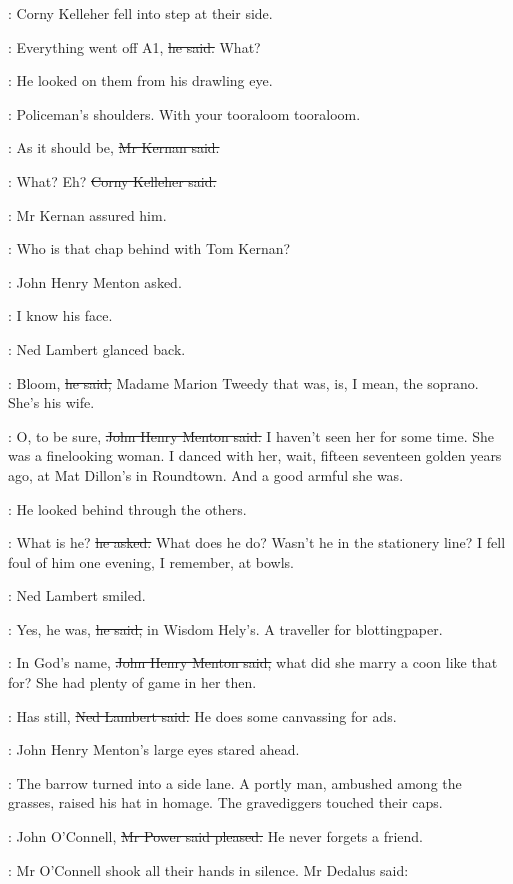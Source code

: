 :
Corny Kelleher fell into step at their side.

\corny:
Everything went off A1,
\sout{he said.}
What?

:
He looked on them from his drawling eye.

\BloomInt:
Policeman's shoulders.
With your tooraloom tooraloom.

:
As it should be,
\sout{Mr Kernan said.}

\corny:
What?
Eh?
\sout{Corny Kelleher said.}

:
Mr Kernan assured him.

\menton:
Who is that chap behind with Tom Kernan?

:
John Henry Menton asked.

\menton:
I know his face.

:
Ned Lambert glanced back.

\lambert:
Bloom,
\sout{he said,}
Madame Marion Tweedy that was,
is, I mean,
the soprano.
She's his wife.

\menton:
O, to be sure,
\sout{John Henry Menton said.}
I haven't seen her for some time.
She was a finelooking woman.
I danced with her, wait, fifteen seventeen golden years ago,
at Mat Dillon's in Roundtown.
And a good armful she was.

:
He looked behind through the others.

\menton:
What is he?
\sout{he asked.}
What does he do?
Wasn't he in the stationery line?
I fell foul of him one evening, I remember, at bowls.

:
Ned Lambert smiled.

\lambert:
Yes, he was,
\sout{he said,}
in Wisdom Hely's.
A traveller for blottingpaper.

\menton:
In God's name,
\sout{John Henry Menton said,}
what did she marry a coon like that for?
She had plenty of game in her then.

\lambert:
Has still,
\sout{Ned Lambert said.}
He does some canvassing for ads.

:
John Henry Menton's large eyes stared ahead.

:
The barrow turned into a side lane.
A portly man, ambushed among the grasses, raised his hat in homage.
The gravediggers touched their caps.

\power:
John O'Connell,
\sout{Mr Power said pleased.}
He never forgets a friend.

:
Mr O'Connell shook all their hands in silence.
Mr Dedalus said:

